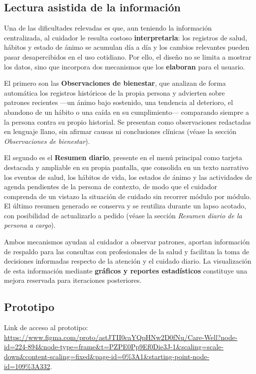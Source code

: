 \documentclass[a4paper,12pt]{article}
\begin{document}
    \subsection{Lectura asistida de la información}
    \par Una de las dificultades relevadas es que, aun teniendo la información centralizada, al cuidador le resulta costoso \textbf{interpretarla}: los registros de salud, hábitos y estado de ánimo se acumulan día a día y los cambios relevantes pueden pasar desapercibidos en el uso cotidiano. Por ello, el diseño no se limita a mostrar los datos, sino que incorpora dos mecanismos que los \textbf{elaboran} para el usuario.
    \par El primero son las \textbf{Observaciones de bienestar}, que analizan de forma automática los registros históricos de la propia persona y advierten sobre patrones recientes —un ánimo bajo sostenido, una tendencia al deterioro, el abandono de un hábito o una caída en su cumplimiento— comparando siempre a la persona contra su propio historial. Se presentan como observaciones redactadas en lenguaje llano, sin afirmar causas ni conclusiones clínicas (véase la sección \textit{Observaciones de bienestar}).
    \par El segundo es el \textbf{Resumen diario}, presente en el menú principal como tarjeta destacada y ampliable en su propia pantalla, que consolida en un texto narrativo los eventos de salud, los hábitos de vida, los estados de ánimo y las actividades de agenda pendientes de la persona de contexto, de modo que el cuidador comprenda de un vistazo la situación de cuidado sin recorrer módulo por módulo. El último resumen generado se conserva y se reutiliza durante un lapso acotado, con posibilidad de actualizarlo a pedido (véase la sección \textit{Resumen diario de la persona a cargo}).
    \par Ambos mecanismos ayudan al cuidador a observar patrones, aportan información de respaldo para las consultas con profesionales de la salud y facilitan la toma de decisiones informadas respecto de la atención y el cuidado diario. La visualización de esta información mediante \textbf{gráficos y reportes estadísticos} constituye una mejora reservada para iteraciones posteriores.
    \subsection{Prototipo}
    \par Link de acceso al prototipo: 
    \\
    \url{https://www.figma.com/proto/astJTII0caYQpHNw2D0fNu/Care-Well?node-id=224-894&node-type=frame&t=PZPE0Pp9Ef0Die3J-1&scaling=scale-down&content-scaling=fixed&page-id=0%3A1&starting-point-node-id=109%3A332}.

    
    


    \newpage

    \printbibliography[heading=bibintoc]
\end{document}
